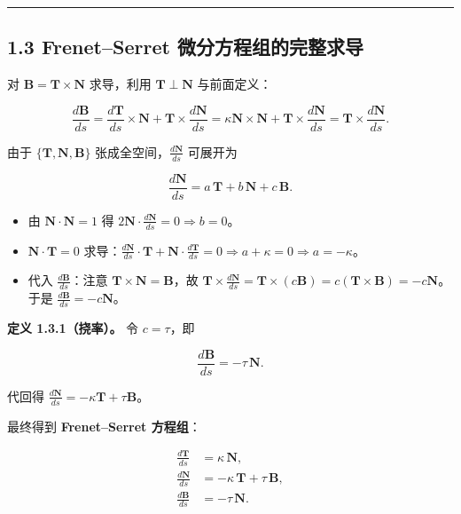 \begin{center}\rule{0.5\linewidth}{0.5pt}\end{center}

\subsection{1.3 Frenet--Serret
微分方程组的完整求导}\label{frenetserret-ux5faeux5206ux65b9ux7a0bux7ec4ux7684ux5b8cux6574ux6c42ux5bfc}

对 \(\mathbf{B}=\mathbf{T}\times\mathbf{N}\) 求导，利用
\(\mathbf{T}\perp\mathbf{N}\) 与前面定义：

\[
\frac{d\mathbf{B}}{ds}=\frac{d\mathbf{T}}{ds}\times\mathbf{N}+\mathbf{T}\times\frac{d\mathbf{N}}{ds}
=\kappa\mathbf{N}\times\mathbf{N}+\mathbf{T}\times\frac{d\mathbf{N}}{ds}
=\mathbf{T}\times\frac{d\mathbf{N}}{ds}.
\]

由于 \(\{\mathbf{T},\mathbf{N},\mathbf{B}\}\)
张成全空间，\(\frac{d\mathbf{N}}{ds}\) 可展开为

\[
\frac{d\mathbf{N}}{ds}=a\,\mathbf{T}+b\,\mathbf{N}+c\,\mathbf{B}.
\]

\begin{itemize}
\tightlist
\item
  由 \(\mathbf{N}\cdot\mathbf{N}=1\) 得
  \(2\mathbf{N}\cdot\frac{d\mathbf{N}}{ds}=0\Rightarrow b=0\)。
\item
  \(\mathbf{N}\cdot\mathbf{T}=0\)
  求导：\(\frac{d\mathbf{N}}{ds}\cdot\mathbf{T}+\mathbf{N}\cdot\frac{d\mathbf{T}}{ds}=0\Rightarrow a+\kappa=0\Rightarrow a=-\kappa\)。
\item
  代入 \(\frac{d\mathbf{B}}{ds}\)：注意
  \(\mathbf{T}\times\mathbf{N}=\mathbf{B}\)，故
  \(\mathbf{T}\times\frac{d\mathbf{N}}{ds}=\mathbf{T}\times(c\mathbf{B})=c(\mathbf{T}\times\mathbf{B})=-c\mathbf{N}\)。于是
  \(\frac{d\mathbf{B}}{ds}=-c\mathbf{N}\)。
\end{itemize}

\textbf{定义 1.3.1（挠率）。} 令 \(c=\tau\)，即

\[
\frac{d\mathbf{B}}{ds}=-\tau\,\mathbf{N}.
\]

代回得 \(\frac{d\mathbf{N}}{ds}=-\kappa\mathbf{T}+\tau\mathbf{B}\)。

最终得到 \textbf{Frenet--Serret 方程组}：

\[
\boxed{
\begin{aligned}
\frac{d\mathbf{T}}{ds}&=\kappa\,\mathbf{N},\\[2mm]
\frac{d\mathbf{N}}{ds}&=-\kappa\,\mathbf{T}+\tau\,\mathbf{B},\\[2mm]
\frac{d\mathbf{B}}{ds}&=-\tau\,\mathbf{N}.
\end{aligned}}
\]

